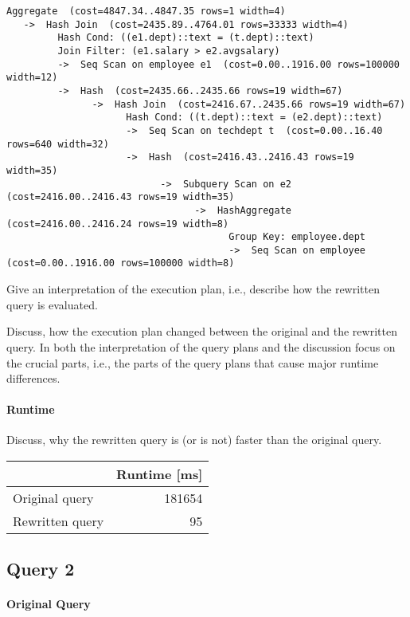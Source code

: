 \documentclass[11pt]{scrartcl}
\begin{document}
\begin{verbatim}
Aggregate  (cost=4847.34..4847.35 rows=1 width=4)
   ->  Hash Join  (cost=2435.89..4764.01 rows=33333 width=4)
         Hash Cond: ((e1.dept)::text = (t.dept)::text)
         Join Filter: (e1.salary > e2.avgsalary)
         ->  Seq Scan on employee e1  (cost=0.00..1916.00 rows=100000 width=12)
         ->  Hash  (cost=2435.66..2435.66 rows=19 width=67)
               ->  Hash Join  (cost=2416.67..2435.66 rows=19 width=67)
                     Hash Cond: ((t.dept)::text = (e2.dept)::text)
                     ->  Seq Scan on techdept t  (cost=0.00..16.40 rows=640 width=32)
                     ->  Hash  (cost=2416.43..2416.43 rows=19 width=35)
                           ->  Subquery Scan on e2  (cost=2416.00..2416.43 rows=19 width=35)
                                 ->  HashAggregate  (cost=2416.00..2416.24 rows=19 width=8)
                                       Group Key: employee.dept
                                       ->  Seq Scan on employee  (cost=0.00..1916.00 rows=100000 width=8)
\end{verbatim}

Give an interpretation of the execution plan, i.e., describe how the
rewritten query is evaluated.

Discuss, how the execution plan changed between the original and the
rewritten query. In both the interpretation of the query plans and the
discussion focus on the crucial parts, i.e., the parts of the query
plans that cause major runtime differences.

\paragraph{Runtime} Discuss, why the rewritten query is (or is not)
faster than the original query.


\begin{table}[H]
  \begin{tabular}{l|r}
    & Runtime [ms] \\
   \hline
    Original query & 181654 \\
    Rewritten query & 95 \\
  \end{tabular}
\end{table}

\subsection*{Query 2}

\paragraph{Original Query}
\end{document}
